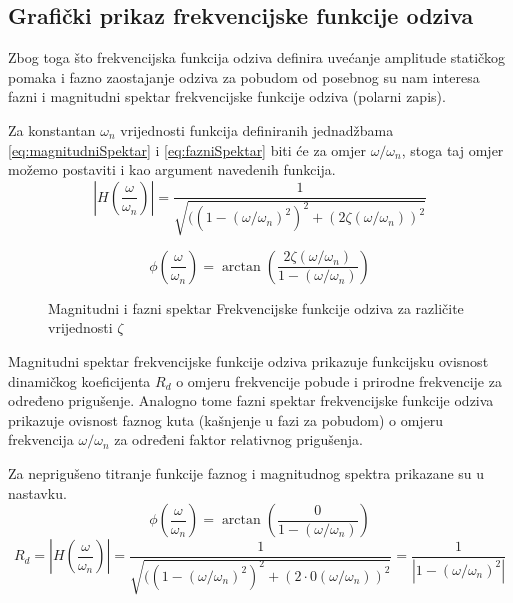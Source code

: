\subsection{Grafički prikaz frekvencijske funkcije odziva}
Zbog toga što frekvencijska funkcija odziva definira uvećanje amplitude statičkog
pomaka i fazno zaostajanje odziva za pobudom od posebnog su nam interesa fazni i
magnitudni spektar frekvencijske funkcije odziva (polarni zapis).
\par

Za konstantan $\omega_n$ vrijednosti funkcija definiranih jednadžbama 
\eqref{eq:magnitudniSpektar} i \eqref{eq:fazniSpektar} biti će za omjer
$\omega/\omega_n$, stoga taj omjer možemo postaviti i kao argument navedenih
funkcija. 
\begin{equation}\label{eq:magnitudniSpektarZaOmjer}
    \left|H\left(\frac{\omega}{\omega_n}\right)\right|=
        \frac{1}{\sqrt{((1-(\omega/\omega_n)^2)^2+(2\zeta(\omega/\omega_n))^2}}
\end{equation}

\begin{equation}\label{eq:fazniSpektarZaOmjer}
    \phi\left(\frac{\omega}{\omega_n}\right)=
        \arctan\left(\frac{2\zeta(\omega/\omega_n)}{1-(\omega/\omega_n)}\right)
\end{equation}

\begin{figure}[H]
    \begin{subfigure}{1\textwidth}
        
    \end{subfigure}
    \vfill
    \begin{subfigure}{1\textwidth}
        
    \end{subfigure}
    \caption{Magnitudni i fazni spektar Frekvencijske funkcije odziva za različite vrijednosti $\zeta$}
    \label{fig:frf-priguseno}
\end{figure}

Magnitudni spektar frekvencijske funkcije odziva prikazuje funkcijsku ovisnost
dinamičkog koeficijenta $R_d$ o omjeru frekvencije pobude i prirodne frekvencije za
određeno prigušenje. Analogno tome fazni spektar frekvencijske funkcije odziva
prikazuje ovisnost faznog kuta (kašnjenje u fazi za pobudom) o omjeru frekvencija 
$\omega/\omega_n$ za određeni faktor relativnog prigušenja.
\par

Za neprigušeno titranje funkcije faznog i magnitudnog spektra prikazane su u
nastavku.
\begin{equation}\label{eq:fazniSpektarNepriguseno}
    \phi\left(\frac{\omega}{\omega_n}\right)=
        \arctan\left(\frac{0}{1-(\omega/\omega_n)}\right)
\end{equation}
\begin{equation}\label{eq:magnitudniSpektarNepriguseno}
    R_d=\left|H\left(\frac{\omega}{\omega_n}\right)\right|=
        \frac{1}{\sqrt{((1-(\omega/\omega_n)^2)^2+(2\cdot 0(\omega/\omega_n))^2}} =
        \frac{1}{|1-(\omega/\omega_n)^2|}
\end{equation}

